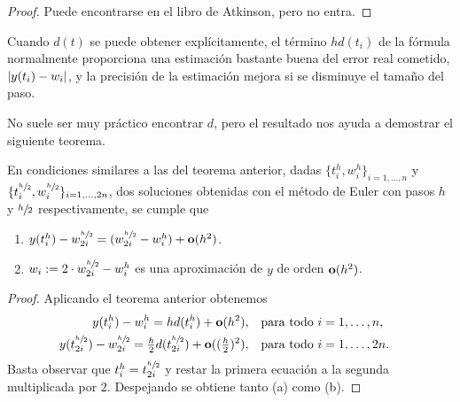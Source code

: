 \begin{proof}
    Puede encontrarse en el libro de Atkinson, pero no entra.
\end{proof}

\begin{remark}
    Cuando $d(t)$ se puede obtener explícitamente,
    el término $hd(t_i)$ de la fórmula normalmente proporciona
    una estimación bastante buena del error real cometido, $\abs{y(t_i) - w_i}$,
    y la precisión de la estimación mejora si se disminuye el tamaño del paso.
\end{remark}

No suele ser muy práctico encontrar $d$,
pero el resultado nos ayuda a demostrar el siguiente teorema.

\begin{theorem}
    \newcommand{\hh}{\sfrac{h}{2}}

    En condiciones similares a las del teorema anterior,
    dadas $\{t_i^h, w_i^h\}_{i = 1,\ldots,n}$
    y $\{t_i^{\hh}, w_i^{\hh}\}_{i = 1,\ldots,2n}$,
    dos soluciones obtenidas con el método de Euler
    con pasos $h$ y $\hh$ respectivamente,
    se cumple que
    \begin{enumerate}[label=(\alph*)]
        \item $y(t_i^h) - w_{2i}^{\hh} = (w_{2i}^{\hh} - w_i^h) + \vo(h^2)$.
        \item $w_i := 2\cdot w_{2i}^{\hh} - w_i^h$
        es una aproximación de $y$ de orden $\vb{o}(h^2)$.
    \end{enumerate}
\end{theorem}

\begin{proof}
    \newcommand{\hh}{\sfrac{h}{2}}

    Aplicando el teorema anterior obtenemos
    \begin{align*}
        y(t_i^h) - w_i^h = hd(t_i^h) + \vo(h^2),
            & \qq{para todo $i = 1,\ldots,n$,} \\
        y(t_{2i}^{\hh}) - w_{2i}^{\hh} = \tfrac{h}{2}d(t_{2i}^{\hh})
            + \vo((\tfrac{h}{2})^2),
            & \qq{para todo $i = 1,\ldots,2n$.}
    \end{align*}
    Basta observar que $t_i^h = t_{2i}^{\hh}$
    y restar la primera ecuación a la segunda multiplicada por $2$.
    Despejando se obtiene tanto (a) como (b).
\end{proof}

